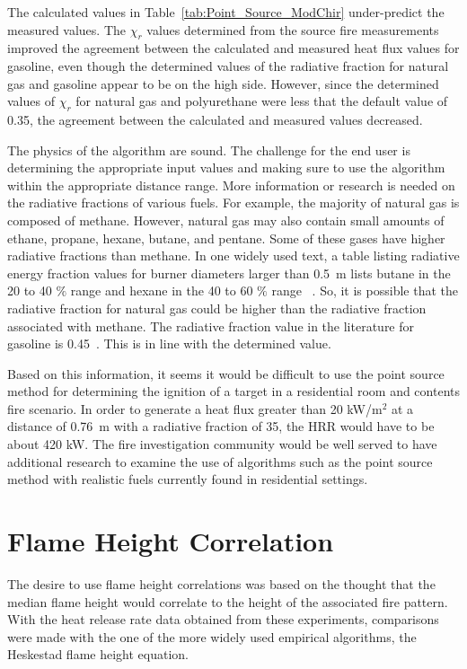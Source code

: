 \documentclass[twoside]{uocthesis}
\begin{document}
{The calculated values in Table~\ref{tab:Point_Source_ModChir} under-predict the measured values.  The $\chi_r$ values determined from the source fire measurements improved the agreement between the calculated and measured heat flux values for gasoline, even though the determined values of the radiative fraction for natural gas and gasoline appear to be on the high side. However, since the determined values of $\chi_r$ for natural gas and polyurethane were less that the default value of 0.35, the agreement between the calculated and measured values decreased.  

The physics of the algorithm are sound.  The challenge for the end user is determining the appropriate input values and making sure to use the algorithm within the appropriate distance range.  More information or research is needed on the radiative fractions of various fuels.  For example, the majority of natural gas is composed of methane.  However, natural gas may also contain small amounts of ethane, propane, hexane, butane, and pentane. Some of these gases have higher radiative fractions than methane. In one widely used text, a table listing radiative energy fraction values for burner diameters larger than 0.5~m lists butane in the 20 to 40 $\%$ range and hexane in the 40 to 60 $\%$ range ~\cite{Quintiere:1997}.  So, it is possible that the radiative fraction for natural gas could be higher than the radiative fraction associated with methane.  The radiative fraction value in the literature for gasoline is 0.45~\cite{Quintiere:1997, IAAI:2017}.  This is in line with the determined value.

Based on this information, it seems it would be difficult to use the point source method for determining the ignition of a target in a residential room and contents fire scenario.  In order to generate a heat flux greater than 20 kW/m$^2$ at a distance of 0.76~m with a radiative fraction of 35, the HRR would have to be about 420 kW.
The fire investigation community would be well served to have additional research to examine the use of algorithms such as the point source method with realistic fuels currently found in residential settings.

\section{Flame Height Correlation}

The desire to use flame height correlations was based on the thought that the median flame height would correlate to the height of the associated fire pattern.  With the heat release rate data obtained from these experiments, comparisons were made with the one of the more widely used empirical algorithms, the Heskestad flame height equation.  

}
\end{document}
